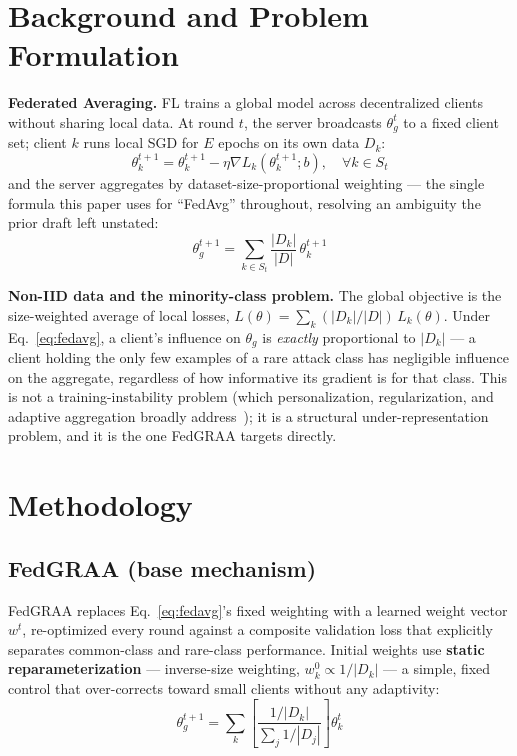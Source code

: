 \documentclass{llncs}
\begin{document}
\section{Background and Problem Formulation}

\textbf{Federated Averaging.} FL trains a global model across decentralized clients without sharing local data. At round $t$, the server broadcasts $\theta_g^t$ to a fixed client set; client $k$ runs local SGD for $E$ epochs on its own data $D_k$:
\begin{equation}
\theta_k^{t+1} = \theta_k^{t+1} - \eta \nabla L_k(\theta_k^{t+1}; b), \quad \forall k \in S_t
\label{eq:local-sgd}
\end{equation}
and the server aggregates by dataset-size-proportional weighting --- the single formula this paper uses for ``FedAvg'' throughout, resolving an ambiguity the prior draft left unstated:
\begin{equation}
\theta_g^{t+1} = \sum_{k \in S_t} \frac{|D_k|}{|D|}\, \theta_k^{t+1}
\label{eq:fedavg}
\end{equation}

\textbf{Non-IID data and the minority-class problem.} The global objective is the size-weighted average of local losses, $L(\theta) = \sum_k (|D_k|/|D|)\, L_k(\theta)$. Under Eq.~\eqref{eq:fedavg}, a client's influence on $\theta_g$ is \emph{exactly} proportional to $|D_k|$ --- a client holding the only few examples of a rare attack class has negligible influence on the aggregate, regardless of how informative its gradient is for that class. This is not a training-instability problem (which personalization, regularization, and adaptive aggregation broadly address~\cite{FedProx,SCAFFOLD}); it is a structural under-representation problem, and it is the one FedGRAA targets directly.

\section{Methodology}
\label{sec:methodology}

\subsection{FedGRAA (base mechanism)}

FedGRAA replaces Eq.~\eqref{eq:fedavg}'s fixed weighting with a learned weight vector $w^t$, re-optimized every round against a composite validation loss that explicitly separates common-class and rare-class performance. Initial weights use \textbf{static reparameterization} --- inverse-size weighting, $w_k^0 \propto 1/|D_k|$ --- a simple, fixed control that over-corrects toward small clients without any adaptivity:
\begin{equation}
\theta_g^{t+1} = \sum_k \left[ \frac{1/|D_k|}{\sum_j 1/|D_j|} \right] \theta_k^t
\label{eq:static-reparam}
\end{equation}
\end{document}
